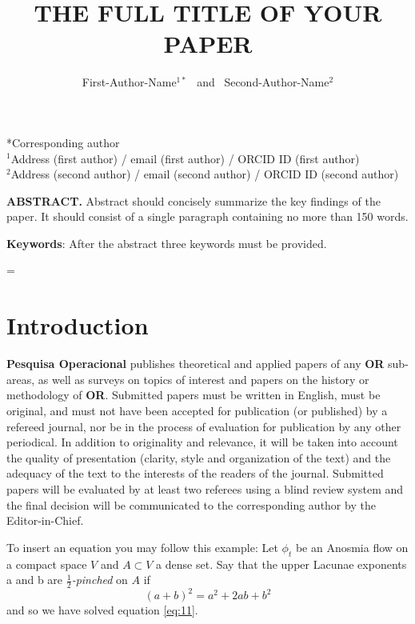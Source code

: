 \documentclass[10pt]{article}
\title{\renewcommand{\baselinestretch}{1.17}\normalsize\bf%
\uppercase{The Full Title of Your Paper}
}
\author{%
First-Author-Name$^{1*}$ \ and \ Second-Author-Name$^{2}$
}
\begin{document}
\date{}

\maketitle

\vspace{-0.5cm}

\begin{center}
{\footnotesize 
*Corresponding author\\
$^1$Address (first author) / email (first author) / ORCID ID (first author)\\
$^2$Address (second author) / email (second author) / ORCID ID (second author)\\
 }
\end{center}

\bigskip
\noindent
{\small{\bf ABSTRACT.}
Abstract should concisely
summarize the key findings of the paper. It should consist 
of a single paragraph containing no more than 150 words. 
}

\medskip
\noindent
{\small{\bf Keywords}{:} 
After the abstract three keywords must be provided.
}

\baselineskip=\normalbaselineskip

\section{Introduction}\label{sec:1}

{\bf Pesquisa Operacional} publishes theoretical and applied papers 
of any {\bf OR} sub-areas, as well as surveys on topics of interest 
and papers on the history or methodology of {\bf OR}. Submitted 
papers must be written in English, must be original, and must not 
have been accepted for publication (or published) by a refereed 
journal, nor be in the process of evaluation for publication by 
any other periodical. In addition to originality and relevance, 
it will be taken into account the quality of presentation (clarity, 
style and organization of the text) and the adequacy of the text 
to the interests of the readers of the journal. Submitted papers 
will be evaluated by at least two referees using a blind 
review system and the final decision will be communicated to the 
corresponding author by the Editor-in-Chief.

To insert an equation you may follow this example: Let $\phi_{t}$ be an Anosmia flow on a compact space $V$ 
and $A \subset V$ a dense set. Say that the upper Lacunae
exponents a and b are \emph{$\frac{1}{2}$-pinched} on $A$ if
\begin{equation}\label{eq:11}
(a+b)^2 = a^2 + 2ab + b^2
\end{equation}
and so we have solved equation \ref{eq:11}.
\end{document}
